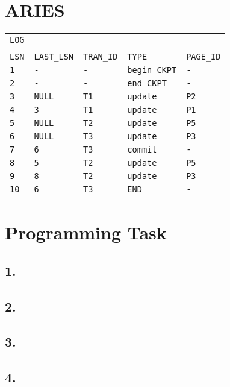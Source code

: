 \documentclass[12pt]{article}
\begin{document}
\section*{ARIES}
\begin{tabular*}{\textwidth}{@{\extracolsep{\fill}}lllll} 
\texttt{LOG}&&&& \\ 
&&&&\\ 
\texttt{LSN} & \texttt{LAST\_LSN} & \texttt{TRAN\_ID} & \texttt{TYPE} & \texttt{PAGE\_ID} \\
\texttt{1} & \texttt{-} & \texttt{-} & \texttt{begin CKPT} & \texttt{-} \\ 
\texttt{2} & \texttt{-} & \texttt{-} & \texttt{end CKPT} & \texttt{-} \\ 
\texttt{3} & \texttt{NULL} & \texttt{T1} & \texttt{update} & \texttt{P2} \\ 
\texttt{4} & \texttt{3} &\texttt{T1} & \texttt{update} & \texttt{P1} \\ 
\texttt{5} & \texttt{NULL} & \texttt{T2} & \texttt{update} & \texttt{P5} \\ 
\texttt{6} & \texttt{NULL} & \texttt{T3} & \texttt{update} & \texttt{P3} \\ 
\texttt{7} & \texttt{6} & \texttt{T3} & \texttt{commit} & \texttt{-} \\ 
\texttt{8} & \texttt{5} & \texttt{T2} & \texttt{update} & \texttt{P5} \\
\texttt{9} & \texttt{8} & \texttt{T2} & \texttt{update} & \texttt{P3} \\
\texttt{10} & \texttt{6} & \texttt{T3} & \texttt{END} & \texttt{-} \\ 
\end{tabular*} 
\section*{Programming Task}
\subsection*{1.}
\subsection*{2.}
\subsection*{3.}
\subsection*{4.}
\end{document}
